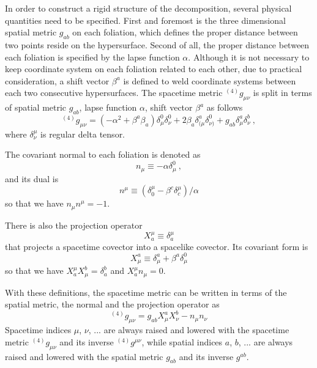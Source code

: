 In order to  construct a rigid structure of the decomposition, several physical quantities need to be specified. First and foremost is the three dimensional spatial metric $g_{ab}$ on each foliation, which defines the proper distance between two points reside on the hypersurface. Second of all, the proper distance between each foliation is specified by the lapse function $\alpha$. Although it is not necessary to keep coordinate system on each foliation related to each other, due to practical consideration, a shift vector $\beta^{a}$ is defined to weld coordinate systems between each two consecutive hypersurfaces. The spacetime metric $^{(4)}g_{\mu\nu}$ is split in terms of spatial metric $g_{ab}$, lapse function $\alpha$, shift vector $\beta^{a}$ as follows
\begin{equation}
	{}^{\left(4\right)}g_{\mu\nu} = \left(-\alpha^2 + \beta^{a}\beta_{a}\right)\delta_\mu^0\delta_\nu^0 
	+ 2\beta_{a}\delta_{(\mu}^a\delta_{\nu)}^0 + g_{ab} \delta^a_\mu \delta^b_\nu \ ,
\end{equation}
where $\delta^{\mu}_{\nu}$ is regular delta tensor. 

The covariant normal to each foliation is denoted as
\begin{equation}\label{normal covector}
n_{\mu} \equiv -\alpha\delta^{0}_{\mu} \ ,
\end{equation}
and its dual is
\begin{equation}\label{normal vector}
n^{\mu} \equiv \left(\delta^{\mu}_{0} - \beta^{c}\delta^{\mu}_{c}\right)/\alpha
\end{equation}
so that we have $n_{\mu}n^{\mu} = -1$. 

There is also the projection operator
\begin{equation}\label{projection 1}
X^{\mu}_{a} \equiv \delta^{\mu}_{a}
\end{equation}
that projects a spacetime covector into a spacelike covector. Its covariant form is
\begin{equation}\label{projection 2}
X^{a}_{\mu} \equiv \delta^{a}_{\mu} + \beta^{a}\delta^{0}_{\mu}
\end{equation}
so that we have $X^{\mu}_{a}X^{b}_{\mu} = \delta^{b}_{a}$ and $X^{\mu}_{a}n_{\mu} = 0$. 

With these definitions, the spacetime metric can be written in terms of the spatial metric, the normal and the projection operator as
\begin{equation}\label{spacetime metric 3 + 1}
^{\left(4\right)}g_{\mu\nu} = g_{ab}X^{a}_{\mu}X^{b}_{\nu} - n_{\mu}n_{\nu}
\end{equation}
Spacetime indices $\mu$, $\nu$, ... are always raised and lowered with the spacetime metric $^{\left(4\right)}g_{\mu\nu}$ and its inverse $^{\left(4\right)}g^{\mu\nu}$, while spatial indices $a$, $b$, ... are always raised and lowered with the spatial metric $g_{ab}$ and its inverse $g^{ab}$. 

